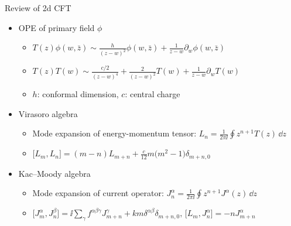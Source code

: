 \documentclass{fdubeamer}
\begin{document}
\begin{frame}{Review of 2d CFT}

\linespread{1.4}
\selectfont

\begin{itemize}
  \item OPE of primary field $\phi$

    \begin{itemize}
      \item $T(z) \phi(w,\bar{z}) \sim \frac{h}{(z-w)^2} \phi(w,\bar{z}) + \frac{1}{z-w} \partial_w\phi(w,\bar{z})$
      \item $T(z) T(w) \sim \frac{c/2}{(z-w)^4} + \frac{2}{(z-w)^2} T(w) + \frac{1}{z-w} \partial_w T(w)$
      \item $h$: conformal dimension, $c$: central charge
    \end{itemize}

  \item Virasoro algebra

    \begin{itemize}
      \item Mode expansion of energy-momentum tensor: $L_n  = \frac{1}{2\pi\ii} \oint z^{n+1} T(z) \, \dd z$
      \item $\bigl[ L_m, L_n \bigr] = (m-n) L_{m+n} + \frac{c}{12} m \bigl( m^2-1 \bigr) \delta_{m+n,0}$
    \end{itemize}

  \item Kac--Moody algebra

    \begin{itemize}
      \item Mode expansion of current operator: $J^\alpha_n = \frac{1}{2\pi\ii} \oint z^{n+1} J^\alpha(z) \, \dd z$
      \item $
          \bigl[ J^\alpha_m, J^\beta_n \bigr] = \ii \sum_\gamma f^{\alpha\beta\gamma} J^\gamma_{m+n} + km \delta^{\alpha\beta} \delta_{m+n,0}, \,
          \bigl[ L_m, J^\alpha_n \bigr] = -n J^\alpha_{m+n}
        $
    \end{itemize}
\end{itemize}

\end{frame}
\end{document}

